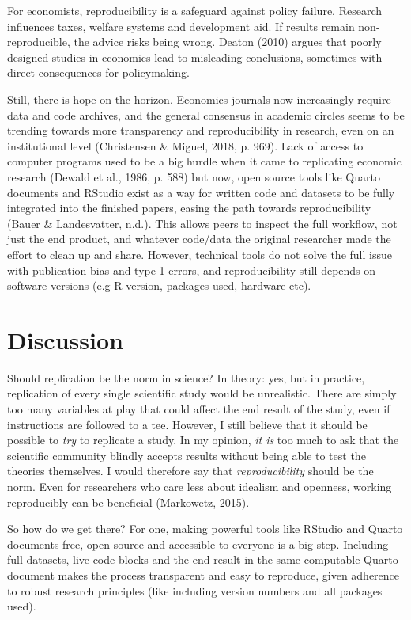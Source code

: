 \documentclass[
  a4paper,
]{article}
\begin{document}
For economists, reproducibility is a safeguard against policy failure.
Research influences taxes, welfare systems and development aid. If
results remain non-reproducible, the advice risks being wrong. Deaton
(2010) argues that poorly designed studies in economics lead to
misleading conclusions, sometimes with direct consequences for
policymaking.

Still, there is hope on the horizon. Economics journals now increasingly
require data and code archives, and the general consensus in academic
circles seems to be trending towards more transparency and
reproducibility in research, even on an institutional level (Christensen
\& Miguel, 2018, p. 969). Lack of access to computer programs used to be
a big hurdle when it came to replicating economic research (Dewald et
al., 1986, p. 588) but now, open source tools like Quarto documents and
RStudio exist as a way for written code and datasets to be fully
integrated into the finished papers, easing the path towards
reproducibility (Bauer \& Landesvatter, n.d.). This allows peers to
inspect the full workflow, not just the end product, and whatever
code/data the original researcher made the effort to clean up and share.
However, technical tools do not solve the full issue with publication
bias and type 1 errors, and reproducibility still depends on software
versions (e.g R-version, packages used, hardware etc).

\section{Discussion}\label{discussion}

Should replication be the norm in science? In theory: yes, but in
practice, replication of every single scientific study would be
unrealistic. There are simply too many variables at play that could
affect the end result of the study, even if instructions are followed to
a tee. However, I still believe that it should be possible to \emph{try}
to replicate a study. In my opinion, \emph{it is} too much to ask that
the scientific community blindly accepts results without being able to
test the theories themselves. I would therefore say that
\emph{reproducibility} should be the norm. Even for researchers who care
less about idealism and openness, working reproducibly can be beneficial
(Markowetz, 2015).

So how do we get there? For one, making powerful tools like RStudio and
Quarto documents free, open source and accessible to everyone is a big
step. Including full datasets, live code blocks and the end result in
the same computable Quarto document makes the process transparent and
easy to reproduce, given adherence to robust research principles (like
including version numbers and all packages used).
\end{document}
